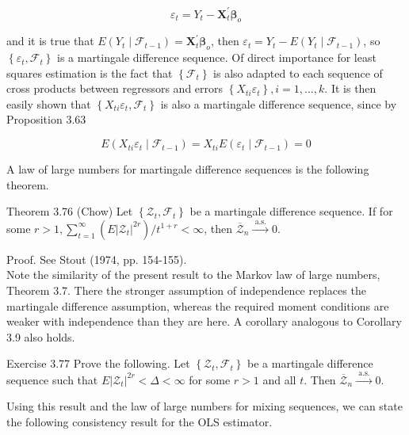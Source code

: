 \documentclass[10pt]{article}
\begin{document}
$$
\varepsilon_{t}=Y_{t}-\mathbf{X}_{t}^{\prime} \boldsymbol{\beta}_{o}
$$

and it is true that $E\left(Y_{t} \mid \mathcal{F}_{t-1}\right)=\mathbf{X}_{t}^{\prime} \boldsymbol{\beta}_{o}$, then $\varepsilon_{t}=Y_{t}-E\left(Y_{t} \mid \mathcal{F}_{t-1}\right)$, so $\left\{\varepsilon_{t}, \mathcal{F}_{t}\right\}$ is a martingale difference sequence. Of direct importance for least squares estimation is the fact that $\left\{\mathcal{F}_{t}\right\}$ is also adapted to each sequence of cross products between regressors and errors $\left\{X_{t i} \varepsilon_{t}\right\}, i=1, \ldots, k$. It is then easily shown that $\left\{X_{t i} \varepsilon_{t}, \mathcal{F}_{t}\right\}$ is also a martingale difference sequence, since by Proposition 3.63

$$
E\left(X_{t i} \varepsilon_{t} \mid \mathcal{F}_{t-1}\right)=X_{t i} E\left(\varepsilon_{t} \mid \mathcal{F}_{t-1}\right)=0
$$

A law of large numbers for martingale difference sequences is the following theorem.

Theorem 3.76 (Chow) Let $\left\{\mathcal{Z}_{t}, \mathcal{F}_{t}\right\}$ be a martingale difference sequence. If for some $r>1, \sum_{t=1}^{\infty}\left(E\left|\mathcal{Z}_{t}\right|^{2 r}\right) / t^{1+r}<\infty$, then $\overline{\mathcal{Z}}_{n} \xrightarrow{\text { a.s. }} 0$.

Proof. See Stout (1974, pp. 154-155).\\
Note the similarity of the present result to the Markov law of large numbers, Theorem 3.7. There the stronger assumption of independence replaces the martingale difference assumption, whereas the required moment conditions are weaker with independence than they are here. A corollary analogous to Corollary 3.9 also holds.

Exercise 3.77 Prove the following. Let $\left\{\mathcal{Z}_{t}, \mathcal{F}_{t}\right\}$ be a martingale difference sequence such that $E\left|\mathcal{Z}_{t}\right|^{2 r}<\Delta<\infty$ for some $r>1$ and all $t$. Then $\overline{\mathcal{Z}}_{n} \xrightarrow{\text { a.s. }} 0$.

Using this result and the law of large numbers for mixing sequences, we can state the following consistency result for the OLS estimator.
\end{document}
